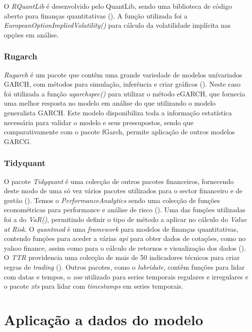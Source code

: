 \documentclass[
  12pt,
  a4paper,
  openany]{book}
\begin{document}
O \emph{RQuantLib} é desenvolvido pelo QuantLib, sendo uma biblioteca de código aberto para finanças quantitativas (\citet{RQuantLib}). A função utilizada foi a \emph{EuropeanOptionImpliedVolatility()} para cálculo da volatilidade implícita nas opções em análise.

\hypertarget{rugarch}{%
\subsection{Rugarch}\label{rugarch}}

\emph{Rugarch} é um pacote que contêm uma grande variedade de modelos unívariados GARCH, com métodos para simulação, inferência e criar gráficos (\citet{rugarch}). Neste caso foi utilizada a função \emph{ugarchspec()} para utilizar o método eGARCH, que fornecia uma melhor resposta no modelo em análise do que utilizando o modelo generalista GARCH. Este modelo disponibiliza toda a informação estatística necessária para validar o modelo e seus pressupostos, sendo que comparativamente com o pacote fGarch, permite aplicação de outros modelos GARCG.

\hypertarget{tidyquant}{%
\subsection{Tidyquant}\label{tidyquant}}

O pacote \emph{Tidyquant} é uma colecção de outros pacotes financeiros, fornecendo deste modo de uma só vez vários pacotes utilizados para o sector financeiro e de gestão (\citet{tidyquant}). Temos o \emph{PerformanceAnalytics} sendo uma colecção de funções econométricas para performance e análise de risco (\citet{PerformanceAnalytics}). Uma das funções utilizadas foi a do \emph{VaR()}, permitindo definir o tipo de método a aplicar no cálculo do \emph{Value at Risk}. O \emph{quantmod} é uma \emph{framework} para modelos de finanças quantitativas, contendo funções para aceder a várias \emph{api} para obter dados de cotações, como no yahoo finance, assim como para o cálculo de retornos e visualização dos dados (\citet{quantmod}). O \emph{TTR} providencia uma colecção de mais de 50 indicadores técnicos para criar regras de \emph{trading} (\citet{TTR}). Outros pacotes, como o \emph{lubridate}, contêm funções para lidar com datas e tempos, o \emph{zoo} utilizado para series temporais regulares e irregulares e o pacote \emph{xts} para lidar com \emph{timestamps} em series temporais.

\hypertarget{aplicauxe7uxe3o-a-dados-do-modelo}{%
\chapter{Aplicação a dados do modelo}\label{aplicauxe7uxe3o-a-dados-do-modelo}}
\end{document}
